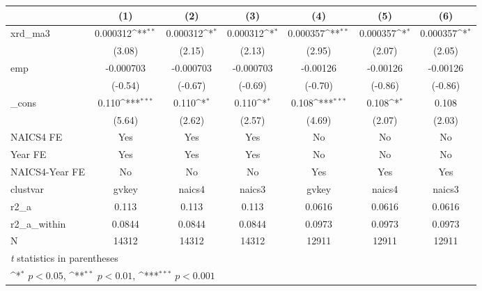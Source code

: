 {
\def\sym#1{\ifmmode^{#1}\else\(^{#1}\)\fi}
\begin{tabular}{l*{6}{c}}
\hline\hline
            &\multicolumn{1}{c}{(1)}         &\multicolumn{1}{c}{(2)}         &\multicolumn{1}{c}{(3)}         &\multicolumn{1}{c}{(4)}         &\multicolumn{1}{c}{(5)}         &\multicolumn{1}{c}{(6)}         \\
\hline
xrd\_ma3     &    0.000312\sym{**} &    0.000312\sym{*}  &    0.000312\sym{*}  &    0.000357\sym{**} &    0.000357\sym{*}  &    0.000357\sym{*}  \\
            &      (3.08)         &      (2.15)         &      (2.13)         &      (2.95)         &      (2.07)         &      (2.05)         \\
[1em]
emp         &   -0.000703         &   -0.000703         &   -0.000703         &    -0.00126         &    -0.00126         &    -0.00126         \\
            &     (-0.54)         &     (-0.67)         &     (-0.69)         &     (-0.70)         &     (-0.86)         &     (-0.86)         \\
[1em]
\_cons      &       0.110\sym{***}&       0.110\sym{*}  &       0.110\sym{*}  &       0.108\sym{***}&       0.108\sym{*}  &       0.108         \\
            &      (5.64)         &      (2.62)         &      (2.57)         &      (4.69)         &      (2.07)         &      (2.03)         \\
[1em]
NAICS4 FE   &         Yes         &         Yes         &         Yes         &          No         &          No         &          No         \\
[1em]
Year FE     &         Yes         &         Yes         &         Yes         &          No         &          No         &          No         \\
[1em]
NAICS4-Year FE&          No         &          No         &          No         &         Yes         &         Yes         &         Yes         \\
\hline
clustvar    &       gvkey         &      naics4         &      naics3         &       gvkey         &      naics4         &      naics3         \\
r2\_a        &       0.113         &       0.113         &       0.113         &      0.0616         &      0.0616         &      0.0616         \\
r2\_a\_within &      0.0844         &      0.0844         &      0.0844         &      0.0973         &      0.0973         &      0.0973         \\
N           &       14312         &       14312         &       14312         &       12911         &       12911         &       12911         \\
\hline\hline
\multicolumn{7}{l}{\footnotesize \textit{t} statistics in parentheses}\\
\multicolumn{7}{l}{\footnotesize \sym{*} \(p<0.05\), \sym{**} \(p<0.01\), \sym{***} \(p<0.001\)}\\
\end{tabular}
}
